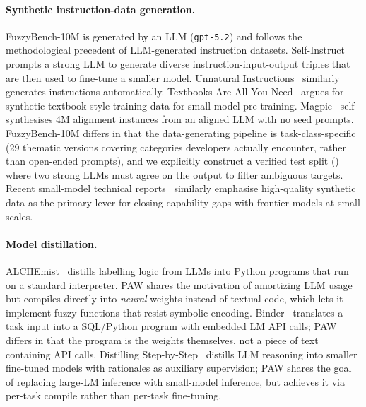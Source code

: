 \documentclass{article}
\theoremstyle{plain}
\theoremstyle{definition}
\theoremstyle{remark}
\begin{document}
\paragraph{Synthetic instruction-data generation.}
FuzzyBench-10M is generated by an LLM (\texttt{gpt-5.2}) and follows the methodological precedent of LLM-generated instruction datasets. Self-Instruct~\citep{wang2023selfinstruct} prompts a strong LLM to generate diverse instruction-input-output triples that are then used to fine-tune a smaller model. Unnatural Instructions~\citep{honovich2023unnatural} similarly generates instructions automatically. Textbooks Are All You Need~\citep{gunasekar2023textbooks} argues for synthetic-textbook-style training data for small-model pre-training. Magpie~\citep{xu2025magpie} self-synthesises 4M alignment instances from an aligned LLM with no seed prompts. FuzzyBench-10M differs in that the data-generating pipeline is task-class-specific (29 thematic versions covering categories developers actually encounter, rather than open-ended prompts), and we explicitly construct a verified test split () where two strong LLMs must agree on the output to filter ambiguous targets. Recent small-model technical reports~\citep{phi42024,gemma3_2025} similarly emphasise high-quality synthetic data as the primary lever for closing capability gaps with frontier models at small scales.

\paragraph{Model distillation.}
ALCHEmist~\citep{NEURIPS2024_72802bef} distills labelling logic from LLMs into Python programs that run on a standard interpreter. PAW shares the motivation of amortizing LLM usage but compiles directly into \emph{neural} weights instead of textual code, which lets it implement fuzzy functions that resist symbolic encoding. Binder~\citep{cheng2023binder} translates a task input into a SQL/Python program with embedded LM API calls; PAW differs in that the program is the weights themselves, not a piece of text containing API calls. Distilling Step-by-Step~\citep{hsieh2023distillingstepbystep} distills LLM reasoning into smaller fine-tuned models with rationales as auxiliary supervision; PAW shares the goal of replacing large-LM inference with small-model inference, but achieves it via per-task compile rather than per-task fine-tuning.
\end{document}
